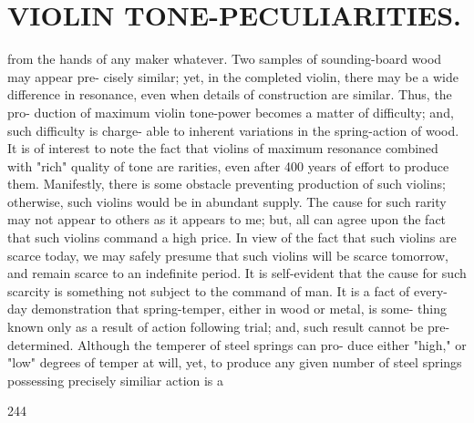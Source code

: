 \documentclass{article}
\begin{document}
\section*{VIOLIN TONE-PECULIARITIES.}
from the hands of any maker whatever. Two samples of sounding-board wood may appear pre- cisely similar; yet, in the completed violin, there may be a wide difference in resonance, even when details of construction are similar. Thus, the pro- duction of maximum violin tone-power becomes a matter of difficulty; and, such difficulty is charge- able to inherent variations in the spring-action of wood. It is of interest to note the fact that violins of maximum resonance combined with "rich" quality of tone are rarities, even after 400 years of effort to produce them. Manifestly, there is some obstacle preventing production of such violins; otherwise, such violins would be in abundant supply. The cause for such rarity may not appear to others as it appears to me; but, all can agree upon the fact that such violins command a high price. In view of the fact that such violins are scarce today, we may safely presume that such violins will be scarce tomorrow, and remain scarce to an indefinite period. It is self-evident that the cause for such scarcity is something not subject to the command of man. It is a fact of every-day demonstration that spring-temper, either in wood or metal, is some- thing known only as a result of action following trial; and, such result cannot be pre-determined. Although the temperer of steel springs can pro- duce either "high," or "low" degrees of temper at will, yet, to produce any given number of steel springs possessing precisely similiar action is a

244
\end{document}
